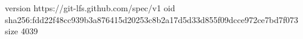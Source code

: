 version https://git-lfs.github.com/spec/v1
oid sha256:fdd22f48cc939b3a876415d20253c8b2a17d5d33d855f09dcce972ce7bd7f073
size 4039
